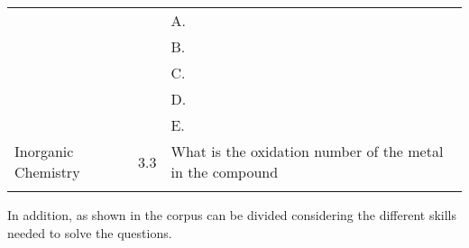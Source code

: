 \begin{xltabular}{\textwidth}{p{2.7cm}p{4em}X}
        & & A.  \\
        & & B.  \\
        & & C.  \\
        & & D.  \\
        & & E.  \\
        \midrule
        Inorganic Chemistry & 3.3 & What is the oxidation number of the metal in the compound \\
        \bottomrule
    \label{tab:chembench_corpus_topic}
\end{xltabular}

\normalsize

In addition, as shown in  the \chembench corpus can be divided considering the different skills needed to solve the questions.

